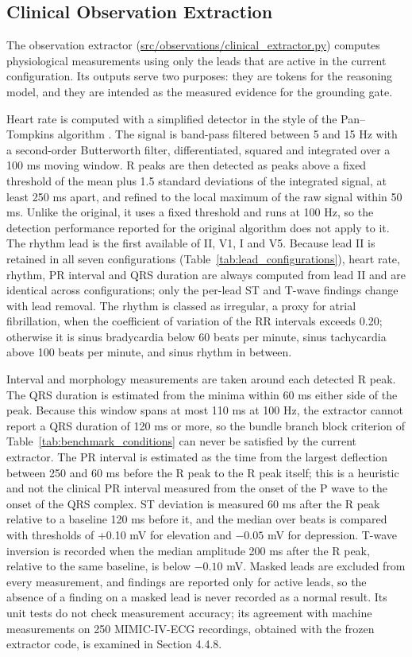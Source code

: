 \subsection{Clinical Observation Extraction}
The observation extractor (\url{src/observations/clinical_extractor.py}) computes physiological measurements using only the leads that are active in the current configuration. Its outputs serve two purposes: they are tokens for the reasoning model, and they are intended as the measured evidence for the grounding gate.

Heart rate is computed with a simplified detector in the style of the Pan--Tompkins algorithm \cite{PAN1985QRS}. The signal is band-pass filtered between 5 and 15 Hz with a second-order Butterworth filter, differentiated, squared and integrated over a 100 ms moving window. R peaks are then detected as peaks above a fixed threshold of the mean plus 1.5 standard deviations of the integrated signal, at least 250 ms apart, and refined to the local maximum of the raw signal within 50 ms. Unlike the original, it uses a fixed threshold and runs at 100 Hz, so the detection performance reported for the original algorithm does not apply to it. The rhythm lead is the first available of II, V1, I and V5. Because lead II is retained in all seven configurations (Table~\ref{tab:lead_configurations}), heart rate, rhythm, PR interval and QRS duration are always computed from lead II and are identical across configurations; only the per-lead ST and T-wave findings change with lead removal. The rhythm is classed as irregular, a proxy for atrial fibrillation, when the coefficient of variation of the RR intervals exceeds 0.20; otherwise it is sinus bradycardia below 60 beats per minute, sinus tachycardia above 100 beats per minute, and sinus rhythm in between.

Interval and morphology measurements are taken around each detected R peak. The QRS duration is estimated from the minima within 60 ms either side of the peak. Because this window spans at most 110 ms at 100 Hz, the extractor cannot report a QRS duration of 120 ms or more, so the bundle branch block criterion of Table~\ref{tab:benchmark_conditions} can never be satisfied by the current extractor. The PR interval is estimated as the time from the largest deflection between 250 and 60 ms before the R peak to the R peak itself; this is a heuristic and not the clinical PR interval measured from the onset of the P wave to the onset of the QRS complex. ST deviation is measured 60 ms after the R peak relative to a baseline 120 ms before it, and the median over beats is compared with thresholds of +0.10 mV for elevation and $-0.05$ mV for depression. T-wave inversion is recorded when the median amplitude 200 ms after the R peak, relative to the same baseline, is below $-0.10$ mV. Masked leads are excluded from every measurement, and findings are reported only for active leads, so the absence of a finding on a masked lead is never recorded as a normal result. Its unit tests do not check measurement accuracy; its agreement with machine measurements on 250 MIMIC-IV-ECG recordings, obtained with the frozen extractor code, is examined in Section 4.4.8.

